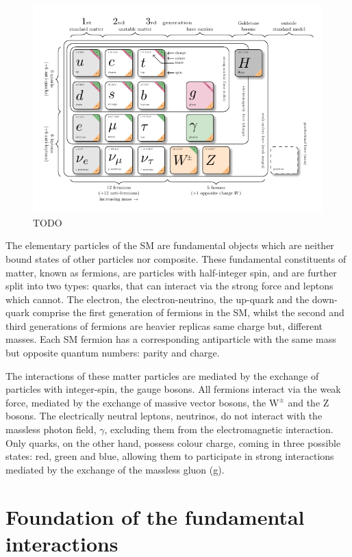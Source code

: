 \begin{figure}[h]
\centering
\includegraphics[width= 1\textwidth]{Figures/Introduction/Particles.pdf}
\caption{TODO}\label{Figure:Introduction_1}
\end{figure}

The elementary particles of the SM are fundamental objects which are neither bound states of other particles nor composite. These fundamental constituents of matter, known as fermions, are particles with half-integer spin, and are further split into two types: quarks, that can interact via the strong force and leptons which cannot.  The electron, the electron-neutrino, the up-quark and the down-quark comprise the first generation of fermions in the SM, whilst the second and third generations of fermions are heavier replicas \ie same charge but, different masses. Each SM fermion has a corresponding antiparticle with the same mass but opposite quantum numbers: parity and charge.

The interactions of these matter particles are mediated by the exchange of particles with integer-spin, the gauge bosons. All fermions interact via the weak force, mediated by the exchange of massive vector bosons, the $\text{W}^\pm$ and the Z bosons. The electrically neutral leptons, neutrinos, do not interact with the massless photon field, $\gamma$, excluding them from the electromagnetic interaction. Only quarks, on the other hand, possess colour charge, coming in three possible states: red, green and blue, allowing them to participate in strong interactions mediated by the exchange of the massless gluon (g). 

\section{Foundation of the fundamental interactions}

